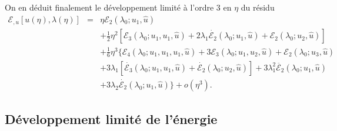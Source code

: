 \documentclass{article}
\newcommand{\nobracket}{}
\newcommand{\nosymbol}{}
\begin{document}
On en déduit finalement le développement limité à l'ordre 3 en
$\eta$ du résidu
\begin{eqnarray}
  \mathcal{E}_{, u} [u (\eta), \lambda (\eta)] & = & \eta \mathcal{E}_2
  (\lambda_0 ; u_1, \hat{u}) \nonumber\\
  &  & \nosymbol + \tfrac{1}{2} \eta^2  [\mathcal{E}_3 (\lambda_0 ; u_1, u_1,
  \hat{u}) + 2 \lambda_1  \dot{\mathcal{E}_2} (\lambda_0 ; u_1, \hat{u})
  +\mathcal{E}_2 (\lambda_0 ; u_2, \hat{u})] \nonumber\\
  &  & \nosymbol + \tfrac{1}{6} \eta^3  \{ \mathcal{E}_4 (\lambda_0 ; u_1,
  u_1, u_1, \hat{u}) + 3\mathcal{E}_3 (\lambda_0 ; u_1, u_2, \hat{u})
  \nobracket +\mathcal{E}_2 (\lambda_0 ; u_3, \hat{u}) \nonumber\\
  &  & \nosymbol + 3 \lambda_1  [\dot{\mathcal{E}_3} (\lambda_0 ; u_1, u_1,
  \hat{u}) + \dot{\mathcal{E}_2} (\lambda_0 ; u_2, \hat{u})] + 3 \lambda_1^2
  \ddot{\mathcal{E}_2} (\lambda_0 ; u_1, \hat{u}) \nonumber\\
  &  & \nobracket \nosymbol + 3 \lambda_2  \dot{\mathcal{E}_2} (\lambda_0 ;
  u_1, \hat{u}) \} + o (\eta^3) .  \label{eq20220107080901}
\end{eqnarray}
\subsection{Développement limité de l'énergie}\label{sec:DL
energie}
\end{document}
